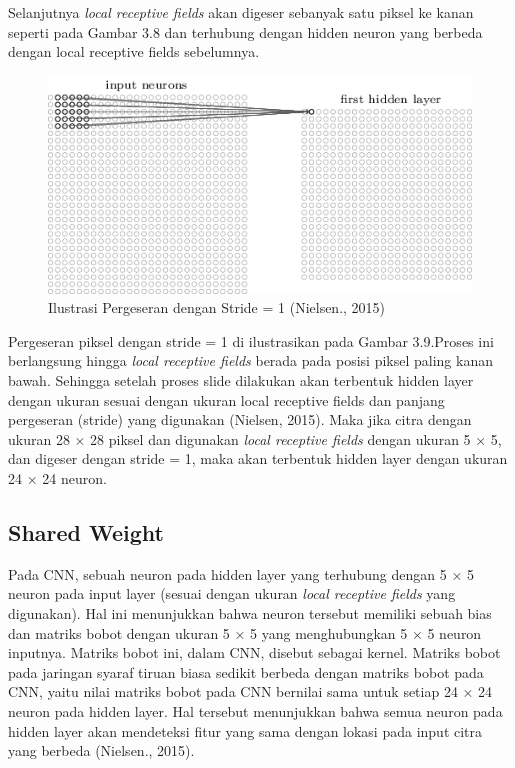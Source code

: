 Selanjutnya \emph{local receptive fields} akan digeser sebanyak satu piksel ke
kanan seperti pada Gambar 3.8 dan terhubung dengan hidden neuron yang 
berbeda dengan local receptive fields sebelumnya.
\begin{figure}[h]
	\centering
	\includegraphics[width=0.65\linewidth]{neuron3}
	\caption{Ilustrasi Pergeseran dengan Stride = 1 (Nielsen., 2015)}
	\label{fig:neuron3}
\end{figure}

Pergeseran piksel dengan stride = 1 di ilustrasikan pada Gambar 3.9.Proses ini berlangsung hingga \emph{local receptive fields} berada pada posisi 
piksel paling kanan bawah. Sehingga setelah proses slide dilakukan akan terbentuk
hidden layer dengan ukuran sesuai dengan ukuran local receptive fields dan 
panjang pergeseran (stride) yang digunakan (Nielsen, 2015). Maka jika citra dengan ukuran 28 × 28 piksel dan digunakan \emph{local receptive fields}
dengan ukuran 5 × 5, dan digeser dengan stride = 1, maka akan terbentuk
hidden layer dengan ukuran 24 × 24 neuron.
\subsection{Shared Weight}
Pada CNN, sebuah neuron pada hidden layer yang terhubung dengan 5 × 5 
neuron pada input layer (sesuai dengan ukuran \emph{local receptive fields} yang 
digunakan). Hal ini menunjukkan bahwa neuron tersebut memiliki sebuah bias dan 
matriks bobot dengan ukuran 5 × 5 yang menghubungkan 5 × 5 neuron inputnya.
Matriks bobot ini, dalam CNN, disebut sebagai kernel. Matriks bobot pada jaringan 
syaraf tiruan biasa sedikit berbeda dengan matriks bobot pada CNN, yaitu nilai 
matriks bobot pada CNN bernilai sama untuk setiap 24 × 24 neuron pada hidden 
layer. Hal tersebut menunjukkan bahwa semua neuron pada hidden layer akan 
mendeteksi fitur yang sama dengan lokasi pada input citra yang berbeda (Nielsen., 
2015).


